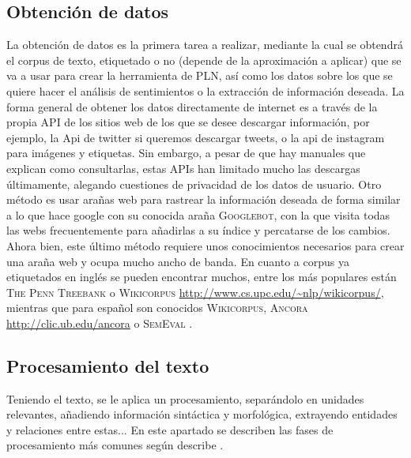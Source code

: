 \subsection{Obtención de datos}
La obtención de datos es la primera tarea a realizar, mediante la cual se obtendrá el corpus de texto, etiquetado o no (depende de la aproximación a aplicar) que se va a usar para crear la herramienta de PLN, así como los datos sobre los que se quiere hacer el análisis de sentimientos o la extracción de información deseada. \newline
La forma general de obtener los datos directamente de internet es a través de la propia API de los sitios web de los que se desee descargar información, por ejemplo, la Api de twitter si queremos descargar tweets, o la api de instagram para imágenes y etiquetas. Sin embargo, a pesar de que hay manuales que explican como consultarlas, estas APIs  han limitado mucho las descargas últimamente, alegando cuestiones de privacidad de los datos de usuario. Otro método es usar arañas web para rastrear la información deseada de forma similar a lo que hace google con su conocida araña \textsc{Googlebot}, con la que visita todas las webs frecuentemente para añadirlas a su índice y percatarse de los cambios. Ahora bien, este último método requiere unos conocimientos necesarios para crear una araña web y ocupa mucho ancho de banda. \newline
En cuanto a corpus ya etiquetados en inglés se pueden encontrar muchos, entre los más populares están \textsc{The Penn Treebank} \citet{marcus1993building} o \textsc{Wikicorpus} \url{http://www.cs.upc.edu/~nlp/wikicorpus/}, mientras que para español son conocidos \textsc{Wikicorpus}, \textsc{Ancora} \url{http://clic.ub.edu/ancora} o \textsc{SemEval} \citet{marquez2007semeval}. 
    
\subsection{Procesamiento del texto}
Teniendo el texto, se le aplica un procesamiento, separándolo en unidades relevantes, añadiendo información sintáctica y morfológica, extrayendo entidades y relaciones entre estas... En este apartado se describen las fases de procesamiento más comunes según describe \citet{9783319155623}.

